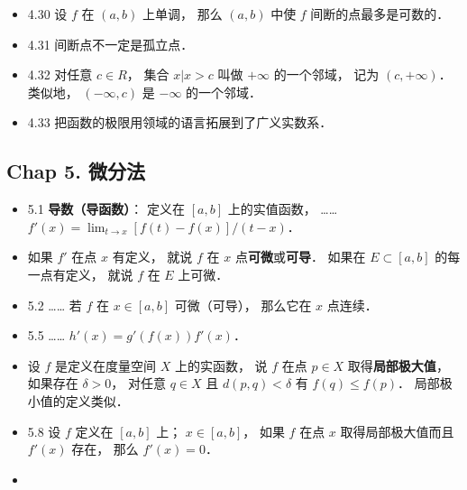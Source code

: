 \begin{itemize}
\item 4.30 设 $f$ 在 $(a,b)$ 上单调， 那么 $(a,b)$ 中使 $f$ 间断的点最多是可数的．

\item 4.31 间断点不一定是孤立点． 

\item 4.32 对任意 $c\in R$， 集合 ${x|x>c}$ 叫做 $+\infty$ 的一个邻域， 记为 $(c,+\infty)$． 类似地， $(-\infty, c)$ 是 $-\infty$ 的一个邻域．

\item 4.33 把函数的极限用领域的语言拓展到了广义实数系．
\end{itemize}

\subsection{Chap 5. 微分法}
\begin{itemize}
\item 5.1 \textbf{导数（导函数）}： 定义在 $[a,b]$ 上的实值函数， …… $f'(x) = \lim_{t\to x} [f(t)-f(x)]/(t-x)$．

\item 如果 $f'$ 在点 $x$ 有定义， 就说 $f$ 在 $x$ 点\textbf{可微}或\textbf{可导}． 如果在 $E\subset [a,b]$ 的每一点有定义， 就说 $f$ 在 $E$ 上可微．

\item 5.2 …… 若 $f$ 在 $x\in [a,b]$ 可微（可导）， 那么它在 $x$ 点连续．

\item 5.5 …… $h'(x) = g'(f(x))f'(x)$．

\item 设 $f$ 是定义在度量空间 $X$ 上的实函数， 说 $f$ 在点 $p\in X$ 取得\textbf{局部极大值}， 如果存在 $\delta>0$， 对任意 $q\in X$ 且 $d(p,q)<\delta$ 有 $f(q)\leqslant f(p)$． 局部极小值的定义类似．

\item 5.8 设 $f$ 定义在 $[a,b]$ 上； $x\in [a,b]$， 如果 $f$ 在点 $x$ 取得局部极大值而且 $f'(x)$ 存在， 那么 $f'(x) = 0$．

\item 
\end{itemize}



